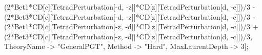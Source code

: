 (2*Bet1*CD[c][TetradPerturbation[-d, -z]]*CD[z][TetradPerturbation[d, -c]])/3 - (2*Bet3*CD[c][TetradPerturbation[-d, -z]]*CD[z][TetradPerturbation[d, -c]])/3 - (2*Bet1*CD[c][TetradPerturbation[-z, -d]]*CD[z][TetradPerturbation[d, -c]])/3 + (2*Bet3*CD[c][TetradPerturbation[-z, -d]]*CD[z][TetradPerturbation[d, -c]])/3, TheoryName -> "GeneralPGT", Method -> "Hard", MaxLaurentDepth -> 3]; 